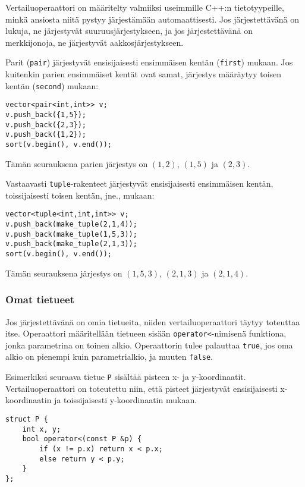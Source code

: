 Vertailuoperaattori on määritelty valmiiksi
useimmille C++:n tietotyypeille,
minkä ansiosta niitä pystyy järjestämään automaattisesti.
Jos järjestettävänä on lukuja, ne järjestyvät
suuruusjärjestykseen,
ja jos järjestettävänä on merkkijonoja,
ne järjestyvät aakkosjärjestykseen.


Parit (\texttt{pair}) järjestyvät ensisijaisesti
ensimmäisen kentän (\texttt{first}) mukaan.
Jos kuitenkin parien ensimmäiset kentät ovat samat,
järjestys määräytyy toisen kentän (\texttt{second}) mukaan:
\begin{lstlisting}
vector<pair<int,int>> v;
v.push_back({1,5});
v.push_back({2,3});
v.push_back({1,2});
sort(v.begin(), v.end());
\end{lstlisting}
Tämän seurauksena parien järjestys on
$(1,2)$, $(1,5)$ ja $(2,3)$.

Vastaavasti \texttt{tuple}-rakenteet
järjestyvät ensisijaisesti ensimmäisen kentän,
toissijaisesti toisen kentän, jne., mukaan:
\begin{lstlisting}
vector<tuple<int,int,int>> v;
v.push_back(make_tuple(2,1,4));
v.push_back(make_tuple(1,5,3));
v.push_back(make_tuple(2,1,3));
sort(v.begin(), v.end());
\end{lstlisting}
Tämän seurauksena järjestys on
$(1,5,3)$, $(2,1,3)$ ja $(2,1,4)$.

\subsubsection{Omat tietueet}

Jos järjestettävänä on omia tietueita,
niiden vertailuoperaattori täytyy toteuttaa itse.
Operaattori määritellään tietueen sisään
\texttt{operator<}-nimisenä funktiona,
jonka parametrina on toinen alkio.
Operaattorin tulee palauttaa \texttt{true},
jos oma alkio on pienempi kuin parametrialkio,
ja muuten \texttt{false}.

Esimerkiksi seuraava tietue \texttt{P}
sisältää pisteen x- ja y-koordinaatit.
Vertailuoperaattori on toteutettu niin,
että pisteet järjestyvät ensisijaisesti x-koor\-di\-naa\-tin
ja toissijaisesti y-koordinaatin mukaan.

\begin{lstlisting}
struct P {
    int x, y;
    bool operator<(const P &p) {
        if (x != p.x) return x < p.x;
        else return y < p.y;
    }
};
\end{lstlisting}

